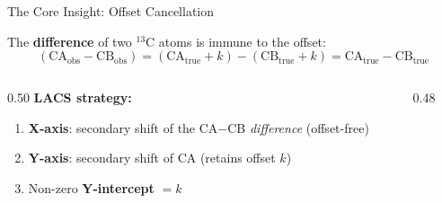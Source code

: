 \documentclass[aspectratio=169,11pt]{beamer}
\begin{document}
\begin{frame}{The Core Insight: Offset Cancellation}

The \textbf{difference} of two ${}^{13}$C atoms is immune to the offset:
\[
\boxed{
(\text{CA}_\text{obs} - \text{CB}_\text{obs})
= (\text{CA}_\text{true} + k) - (\text{CB}_\text{true} + k)
= \text{CA}_\text{true} - \text{CB}_\text{true}
}
\]

\smallskip
\begin{columns}[T]
\begin{column}{0.50\textwidth}
\textbf{LACS strategy:}
\begin{enumerate}\setlength\itemsep{1pt}
  \item \textbf{X-axis}: secondary shift of the CA$-$CB \emph{difference} (offset-free)
  \item \textbf{Y-axis}: secondary shift of CA (retains offset $k$)
  \item Non-zero \textbf{Y-intercept} $= k$
\end{enumerate}
\end{column}
\begin{column}{0.48\textwidth}
\centering
{}
\end{column}
\end{columns}
\end{frame}
\end{document}
